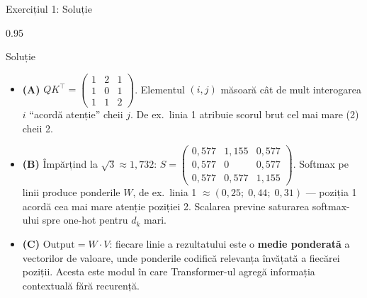 \documentclass[9pt, aspectratio=169, t]{beamer}
\begin{document}
\begin{frame}{Exercițiul 1: Soluție}
    \begin{cminipage}{0.95\textwidth}
    \begin{exampleblock}{Soluție}
        {\footnotesize
        \begin{itemize}\setlength{\itemsep}{3pt}
            \item \textcolor{MainBlue}{\textbf{(A)}}
                $QK^\top = \begin{pmatrix} 1 & 2 & 1 \\ 1 & 0 & 1 \\ 1 & 1 & 2 \end{pmatrix}$.
                Elementul $(i,j)$ măsoară cât de mult interogarea $i$ ``acordă atenție'' cheii $j$. De ex.\ linia 1 atribuie scorul brut cel mai mare (2) cheii 2.
            \item \textcolor{MainBlue}{\textbf{(B)}} Împărțind la $\sqrt{3} \approx 1{,}732$:
                $S = \begin{pmatrix} 0{,}577 & 1{,}155 & 0{,}577 \\ 0{,}577 & 0 & 0{,}577 \\ 0{,}577 & 0{,}577 & 1{,}155 \end{pmatrix}$.
                Softmax pe linii produce ponderile $W$, de ex.\ linia 1 $\approx (0{,}25;\; 0{,}44;\; 0{,}31)$ --- poziția 1 acordă cea mai mare atenție poziției 2. Scalarea previne saturarea softmax-ului spre one-hot pentru $d_k$ mari.
            \item \textcolor{MainBlue}{\textbf{(C)}} $\text{Output} = W \cdot V$: fiecare linie a rezultatului este o \textbf{medie ponderată} a vectorilor de valoare, unde ponderile codifică relevanța învățată a fiecărei poziții. Acesta este modul în care Transformer-ul agregă informația contextuală fără recurență.
        \end{itemize}
        }
    \end{exampleblock}
    \end{cminipage}
\end{frame}
\end{document}

